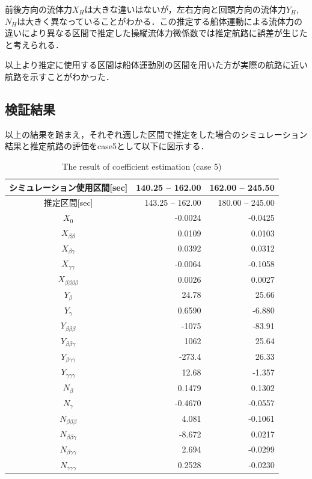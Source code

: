 前後方向の流体力$X_H$は大きな違いはないが，左右方向と回頭方向の流体力$Y_H$,$N_H$は大きく異なっていることがわかる．この推定する船体運動による流体力の違いにより異なる区間で推定した操縦流体力微係数では推定航路に誤差が生じたと考えられる．

以上より推定に使用する区間は船体運動別の区間を用いた方が実際の航路に近い航路を示すことがわかった．


\subsection{検証結果}
以上の結果を踏まえ，それぞれ適した区間で推定をした場合のシミュレーション結果と推定航路の評価をcase5として以下に図示する．

\begin{table}[htbp]
 \caption{The result of coefficient estimation (case 5)}
 \label{tb:5-3}
 \centering
  \begin{tabular}{crr}
   \hline
   シミュレーション使用区間[sec] & 140.25 – 162.00 & 162.00 – 245.50 \\
   \hline
   推定区間[sec] & 143.25 – 162.00 & 180.00 – 245.00 \\
   \hline
   \hline
   $X_0$ & -0.0024  & -0.0425 \\
   $X_{\beta\beta}$ & 0.0109 & 0.0103 \\
   $X_{\beta\gamma}$ & 0.0392 & 0.0312 \\
   $X_{\gamma\gamma}$ & -0.0064  & -0.1058 \\
   $X_{\beta\beta\beta\beta}$ & 0.0026 & 0.0027 \\
   $Y_{\beta}$ & 24.78 & 25.66 \\
   $Y_{\gamma}$ & 0.6590 & -6.880 \\
   $Y_{\beta\beta\beta}$ & -1075 & -83.91 \\
   $Y_{\beta\beta\gamma}$ & 1062 & 25.64 \\
   $Y_{\beta\gamma\gamma}$ & -273.4 & 26.33 \\
   $Y_{\gamma\gamma\gamma}$ & 12.68 & -1.357 \\
   $N_{\beta}$ & 0.1479 & 0.1302 \\
   $N_{\gamma}$ & -0.4670 & -0.0557 \\
   $N_{\beta\beta\beta}$ & 4.081 & -0.1061 \\
   $N_{\beta\beta\gamma}$ & -8.672 & 0.0217 \\
   $N_{\beta\gamma\gamma}$ & 2.694 & -0.0299 \\
   $N_{\gamma\gamma\gamma}$ & 0.2528 & -0.0230 \\
   \hline
  \end{tabular}
\end{table}


